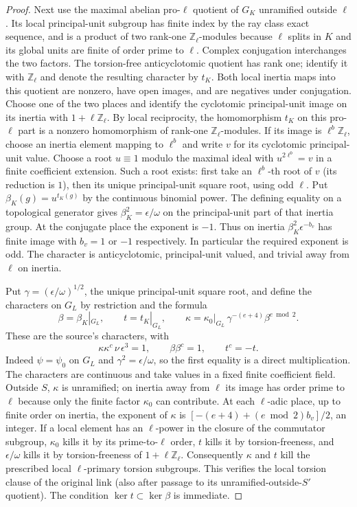 \begin{proof}
Next use the maximal abelian pro-$\ell$ quotient of $G_K$ unramified
outside $\ell$. Its local principal-unit subgroup has finite index
by the ray class exact sequence, and is a product of two rank-one
$\mathbb Z_\ell$-modules because $\ell$ splits in $K$ and its global
units are finite of order prime to $\ell$. Complex conjugation
interchanges the two factors. The torsion-free anticyclotomic
quotient has rank one; identify it with $\mathbb Z_\ell$ and denote
the resulting character by $t_K$. Both local inertia maps into
this quotient are nonzero, have open images, and are negatives
under conjugation. Choose one of the two places and identify the
cyclotomic principal-unit image on its inertia with
$1+\ell\mathbb Z_\ell$. By local reciprocity, the homomorphism
$t_K$ on this pro-$\ell$ part is a nonzero homomorphism of
rank-one $\mathbb Z_\ell$-modules. If its image is
$\ell^b\mathbb Z_\ell$, choose an inertia element mapping to
$\ell^b$ and write $v$ for its cyclotomic principal-unit value.
Choose a root $u\equiv1$ modulo the maximal ideal with
$u^{2\ell^b}=v$ in a finite coefficient extension. Such a root
exists: first take an $\ell^b$-th root of $v$ (its reduction is
$1$), then its unique principal-unit square root, using odd $\ell$.
Put $\beta_K(g)=u^{t_K(g)}$ by the continuous binomial power.
The defining equality on a topological generator gives
$\beta_K^2=\epsilon/\omega$ on the principal-unit part of that
inertia group. At the conjugate place the exponent is $-1$.
Thus on inertia $\beta_K^2\epsilon^{-b_v}$ has finite image
with $b_v=1$ or $-1$ respectively. In particular the required
exponent is odd. The character is anticyclotomic, principal-unit
valued, and trivial away from $\ell$ on inertia.

Put $\gamma=(\epsilon/\omega)^{1/2}$, the unique principal-unit
square root, and define the characters on $G_L$ by restriction
and the formula
\[
 \beta=\beta_K|_{G_L},\qquad t=t_K|_{G_L},\qquad
 \kappa=\kappa_0|_{G_L}\,\gamma^{-(e+4)}\beta^{e\bmod 2}.
\]
These are the source's characters, with
\[
              \kappa\kappa^c\,\nu\,\epsilon^3=1,\qquad
              \beta\beta^c=1,\qquad t^c=-t .
\]
Indeed $\psi=\psi_0$ on $G_L$ and
$\gamma^2=\epsilon/\omega$, so the first equality is a direct
multiplication. The characters are continuous and take values
in a fixed finite coefficient field. Outside $S$, $\kappa$ is
unramified; on inertia away from $\ell$ its image has order
prime to $\ell$ because only the finite factor $\kappa_0$ can
contribute. At each $\ell$-adic place, up to finite order on
inertia, the exponent of $\kappa$ is
$[-(e+4)+(e\bmod2)b_v]/2$, an integer.
If a local element has an $\ell$-power in the closure of the
commutator subgroup, $\kappa_0$ kills it by its prime-to-$\ell$
order, $t$ kills it by torsion-freeness, and $\epsilon/\omega$
kills it by torsion-freeness of $1+\ell\mathbb Z_\ell$.
Consequently $\kappa$ and $t$ kill the prescribed local
$\ell$-primary torsion subgroups. This verifies the local
torsion clause of the original link (also after passage to
its unramified-outside-$S'$ quotient). The condition
$\ker t\subset\ker\beta$ is immediate.
\end{proof}

